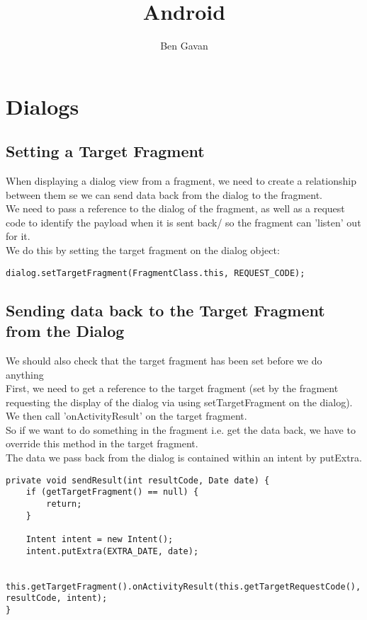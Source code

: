 \documentclass[]{article}
\title{Android}
\author{Ben Gavan}
\begin{document}
\maketitle
\tableofcontents

\section{Dialogs}
\subsection{Setting a Target Fragment}
When displaying a dialog view from a fragment, we need to create a relationship between them se we can send data back from the dialog to the fragment.  
\\
We need to pass a reference to the dialog of the fragment, as well as a request code to identify the payload when it is sent back/ so the fragment can 'listen' out for it.
\\
We do this by setting the target fragment on the dialog object:
\begin{lstlisting}
dialog.setTargetFragment(FragmentClass.this, REQUEST_CODE);
\end{lstlisting}

\subsection{Sending data back to the Target Fragment from the Dialog}
We should also check that the target fragment has been set before we do anything
\\
First, we need to get a reference to the target fragment (set by the fragment requesting the display of the dialog via using setTargetFragment on the dialog).
\\
We then call 'onActivityResult' on the target fragment.
\\
So if we want to do something in the fragment i.e. get the data back, we have to override this method in the target fragment.
\\
The data we pass back from the dialog is contained within an intent by putExtra.
\begin{lstlisting}
private void sendResult(int resultCode, Date date) {
	if (getTargetFragment() == null) {
		return;
	}

	Intent intent = new Intent();
	intent.putExtra(EXTRA_DATE, date);

	this.getTargetFragment().onActivityResult(this.getTargetRequestCode(), resultCode, intent);
}
\end{lstlisting}
\end{document}
